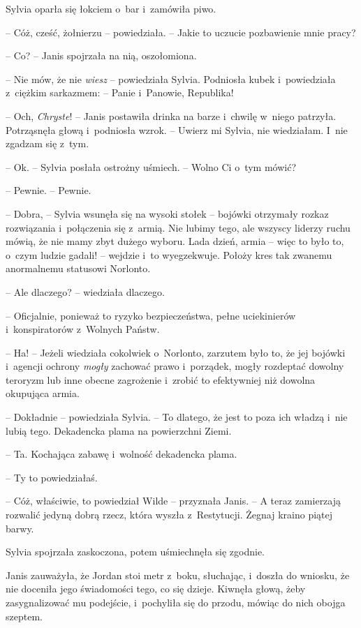 \documentclass[oneside,polish,11pt,sfheadings]{mwbk}
\begin{document}
Sylvia oparła się łokciem o~bar i~zamówiła piwo.

-- Cóż, cześć, żołnierzu -- powiedziała. -- Jakie to uczucie pozbawienie
mnie pracy?

-- Co? -- Janis spojrzała na nią, oszołomiona.

-- Nie mów, że nie \emph{wiesz} -- powiedziała Sylvia. Podniosła kubek i~powiedziała z~ciężkim sarkazmem: -- Panie i~Panowie, Republika!

-- Och, \emph{Chryste}! -- Janis postawiła drinka na barze i~chwilę w~niego patrzyła. Potrząsnęła głową i~podniosła wzrok. -- Uwierz mi Sylvia,
nie wiedziałam. I~nie zgadzam się z~tym.

-- Ok. -- Sylvia posłała ostrożny uśmiech. -- Wolno Ci o~tym mówić?

-- Pewnie. -- Pewnie.

-- Dobra, -- Sylvia wsunęła się na wysoki stołek -- bojówki otrzymały
rozkaz rozwiązania i~połączenia się z~armią. Nie lubimy tego, ale
wszyscy liderzy ruchu mówią, że nie mamy zbyt dużego wyboru. Lada dzień,
armia -- więc to było to, o~czym ludzie gadali! -- wejdzie i~to
wyegzekwuje. Położy kres tak zwanemu anormalnemu statusowi Norlonto.

-- Ale dlaczego? -- wiedziała dlaczego.

-- Oficjalnie, ponieważ to ryzyko bezpieczeństwa, pełne uciekinierów i~konspiratorów z~Wolnych Państw.

-- Ha! -- Jeżeli wiedziała cokolwiek o~Norlonto, zarzutem było to, że jej
bojówki i~agencji ochrony \emph{mogły} zachować prawo i~porządek, mogły
rozdeptać dowolny teroryzm lub inne obecne zagrożenie i~zrobić to
efektywniej niż dowolna okupująca armia.

-- Dokładnie -- powiedziała Sylvia. -- To dlatego, że jest to poza ich
władzą i~nie lubią tego. Dekadencka plama na powierzchni Ziemi.

-- Ta. Kochająca zabawę i~wolność dekadencka plama.

-- Ty to powiedziałaś.

-- Cóż, właściwie, to powiedział Wilde -- przyznała Janis. -- A teraz
zamierzają rozwalić jedyną dobrą rzecz, która wyszła z~Restytucji.
Żegnaj kraino piątej barwy.

Sylvia spojrzała zaskoczona, potem uśmiechnęła się zgodnie.

Janis zauważyła, że Jordan stoi metr z~boku, słuchając, i~doszła do
wniosku, że nie doceniła jego świadomości tego, co się dzieje. Kiwnęła
głową, żeby zasygnalizować mu podejście, i~pochyliła się do przodu,
mówiąc do nich obojga szeptem.
\end{document}
